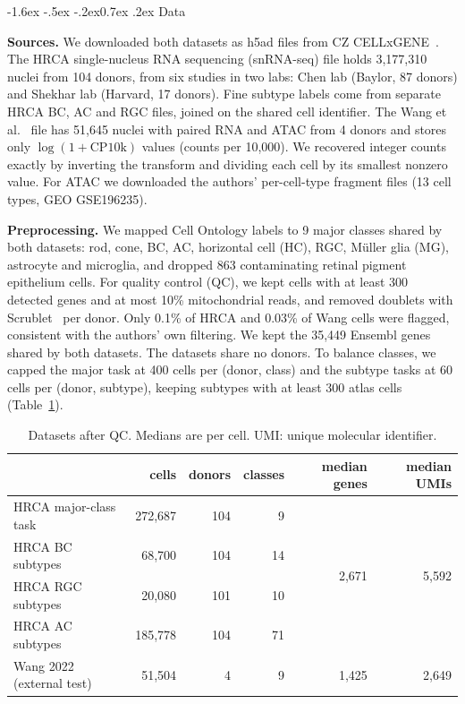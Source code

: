 \documentclass[11pt]{article}
\makeatletter
\renewcommand\section{\@startsection{section}{1}{\z@}%
    {-1.6ex \@plus -.5ex \@minus -.2ex}{0.7ex \@plus .2ex}%
    {\normalfont\large\bfseries}}
\makeatother
\begin{document}
\section{Data}

\textbf{Sources.} We downloaded both datasets as h5ad files from CZ
CELLxGENE~\cite{cellxgene2025}. The HRCA single-nucleus RNA sequencing (snRNA-seq) file
holds 3{,}177{,}310 nuclei from 104 donors, from six studies in two labs: Chen lab (Baylor,
87 donors) and Shekhar lab (Harvard, 17 donors). Fine subtype labels come from separate HRCA
BC, AC and RGC files, joined on the shared cell identifier. The Wang et al.~\cite{wang2022}
file has 51{,}645 nuclei with paired RNA and ATAC from 4 donors and stores only $\log(1+\mathrm{CP10k})$
values (counts per 10{,}000). We recovered integer counts exactly by inverting the transform
and dividing each cell by its smallest nonzero value. For ATAC we downloaded the authors'
per-cell-type fragment files (13 cell types, GEO GSE196235).

\textbf{Preprocessing.} We mapped Cell Ontology labels to 9 major classes shared by both
datasets: rod, cone, BC, AC, horizontal cell (HC), RGC, M\"uller glia (MG), astrocyte and
microglia, and dropped 863 contaminating retinal pigment epithelium cells. For quality
control (QC), we kept cells with at least 300 detected genes and at most 10\% mitochondrial
reads, and removed doublets with Scrublet~\cite{wolock2019} per donor. Only 0.1\% of HRCA
and 0.03\% of Wang cells were flagged, consistent with the authors' own filtering. We kept
the 35{,}449 Ensembl genes shared by both datasets. The datasets share no donors. To balance classes, we capped
the major task at 400 cells per (donor, class) and the subtype tasks at 60 cells per (donor,
subtype), keeping subtypes with at least 300 atlas cells (Table~\ref{tab:data}).

\begin{table}[h]
\centering\small
\caption{Datasets after QC. Medians are per cell. UMI: unique molecular identifier.}
\label{tab:data}
\begin{tabular}{lrrrrr}
\toprule
 & cells & donors & classes & median genes & median UMIs \\
\midrule
HRCA major-class task & 272{,}687 & 104 & 9 & \multirow{4}{*}{2{,}671} & \multirow{4}{*}{5{,}592} \\
HRCA BC subtypes & 68{,}700 & 104 & 14 & & \\
HRCA RGC subtypes & 20{,}080 & 101 & 10 & & \\
HRCA AC subtypes & 185{,}778 & 104 & 71 & & \\
Wang 2022 (external test) & 51{,}504 & 4 & 9 & 1{,}425 & 2{,}649 \\
\bottomrule
\end{tabular}
\end{table}
\end{document}
